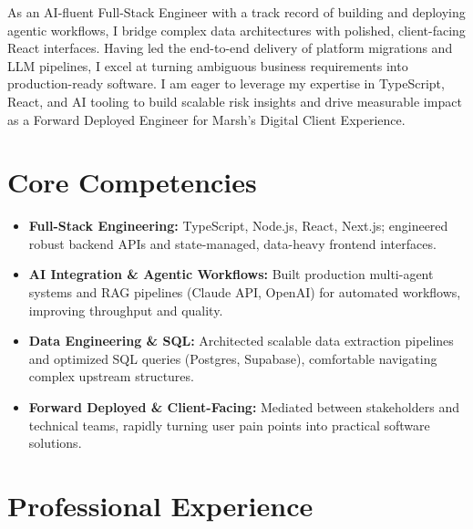\documentclass[11pt,a4paper,sans]{moderncv}
\begin{document}
\makecvtitle

As an AI-fluent Full-Stack Engineer with a track record of building and deploying agentic workflows, I bridge complex data architectures with polished, client-facing React interfaces. Having led the end-to-end delivery of platform migrations and LLM pipelines, I excel at turning ambiguous business requirements into production-ready software. I am eager to leverage my expertise in TypeScript, React, and AI tooling to build scalable risk insights and drive measurable impact as a Forward Deployed Engineer for Marsh's Digital Client Experience.

\vspace{1pt}
\section{Core Competencies}
\vspace{1pt}
\begin{itemize}
\item \textbf{Full-Stack Engineering:} TypeScript, Node.js, React, Next.js; engineered robust backend APIs and state-managed, data-heavy frontend interfaces.
\item \textbf{AI Integration \& Agentic Workflows:} Built production multi-agent systems and RAG pipelines (Claude API, OpenAI) for automated workflows, improving throughput and quality.
\item \textbf{Data Engineering \& SQL:} Architected scalable data extraction pipelines and optimized SQL queries (Postgres, Supabase), comfortable navigating complex upstream structures.
\item \textbf{Forward Deployed \& Client-Facing:} Mediated between stakeholders and technical teams, rapidly turning user pain points into practical software solutions.
\end{itemize}

\vspace{1pt}
\section{Professional Experience}
\vspace{1pt}

\end{document}
